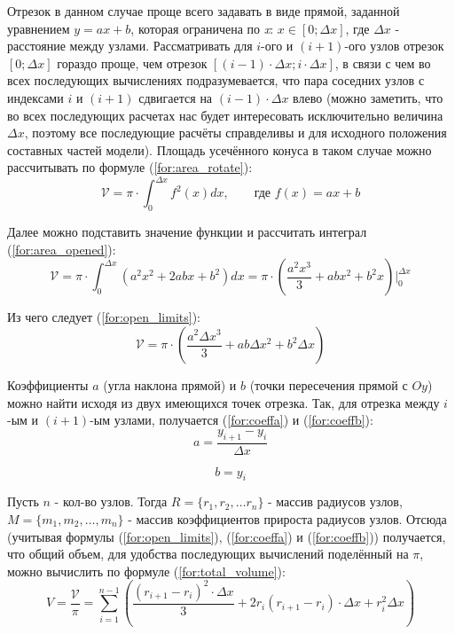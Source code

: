 Отрезок в данном случае проще всего задавать в виде прямой, заданной уравнением $ y = ax + b $, которая ограничена по \textit{x}: $x \in [0; \Delta x]$, где $\Delta x$ - расстояние между узлами. Рассматривать для $i$-ого и $(i + 1)$-ого узлов отрезок $[0; \Delta x]$ гораздо проще, чем отрезок $[(i - 1) \cdot \Delta x; i \cdot \Delta x]$, в связи с чем во всех последующих вычислениях подразумевается, что пара соседних узлов с индексами $i$ и $(i + 1)$ сдвигается на $(i - 1) \cdot \Delta x$ влево (можно заметить, что во всех последующих расчетах нас будет интересовать исключительно величина $\Delta x$, поэтому все последующие расчёты справделивы и для исходного положения составных частей модели). Площадь усечённого конуса в таком случае можно рассчитывать по формуле (\ref{for:area_rotate}):
\begin{equation}
    \label{for:area_rotate}
    \mathcal{V} = \pi \cdot \int_{0}^{\Delta x}f^2(x)dx,\qquad \text{где }f(x) = ax + b
\end{equation}

Далее можно подставить значение функции и рассчитать интеграл (\ref{for:area_opened}):
\begin{equation}
    \label{for:area_opened}
    \mathcal{V} = \pi \cdot \int_{0}^{\Delta x}\left(a^2x^2 + 2abx + b^2\right)dx = \pi \cdot \left(\frac{a^2x^3}{3} + abx^2 + b^2x\right)\Biggr|_{0}^{\Delta x}
\end{equation}

Из чего следует (\ref{for:open_limits}):
\begin{equation}
    \label{for:open_limits}
    \mathcal{V} = \pi \cdot \left(\frac{a^2\Delta x^3}{3} + ab\Delta x^2 + b^2\Delta x\right)
\end{equation}

Коэффициенты $a$ (угла наклона прямой) и $b$ (точки пересечения прямой с $Oy$) можно найти исходя из двух имеющихся точек отрезка. Так, для отрезка между $i$-ым и $(i+1)$-ым узлами, получается (\ref{for:coeffa}) и (\ref{for:coeffb}):
\begin{equation}
    \label{for:coeffa}
    a = \frac{y_{i+1} - y_{i}}{\Delta x}
\end{equation}

\begin{equation}
    \label{for:coeffb}
    b = y_i
\end{equation}

Пусть $n$ - кол-во узлов. Тогда $R = \{ r_1, r_2, \ldots r_n \}$ - массив радиусов узлов, $M = \{ m_1, m_2, \ldots, m_n \}$ - массив коэффициентов прироста радиусов узлов. Отсюда (учитывая формулы (\ref{for:open_limits}), (\ref{for:coeffa}) и (\ref{for:coeffb})) получается, что общий объем, для удобства последующих вычислений поделённый на $\pi$, можно вычислить по формуле (\ref{for:total_volume}):
\begin{equation}
    \label{for:total_volume}
    V = \frac{\mathcal{V}}{\pi} = \sum_{i=1}^{n-1} \left(\frac{(r_{i + 1} - r_i)^2 \cdot \Delta x}{3} + 2 r_i (r_{i + 1} - r_i) \cdot \Delta x + r_i^2 \Delta x \right)
\end{equation}

